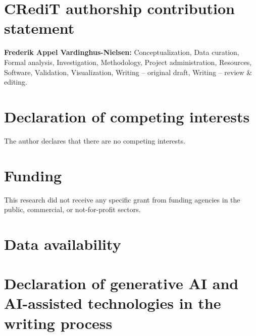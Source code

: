 \section*{CRediT authorship contribution statement}

\textbf{Frederik Appel Vardinghus-Nielsen:} Conceptualization, Data curation,
Formal analysis, Investigation, Methodology, Project administration, Resources,
Software, Validation, Visualization, Writing -- original draft,
Writing -- review \& editing.

\section*{Declaration of competing interests}

The author declares that there are no competing interests.

\section*{Funding}

This research did not receive any specific grant from funding agencies in the public,
commercial, or not-for-profit sectors.

\section*{Data availability}


\section*{Declaration of generative AI and AI-assisted technologies in the writing process}

